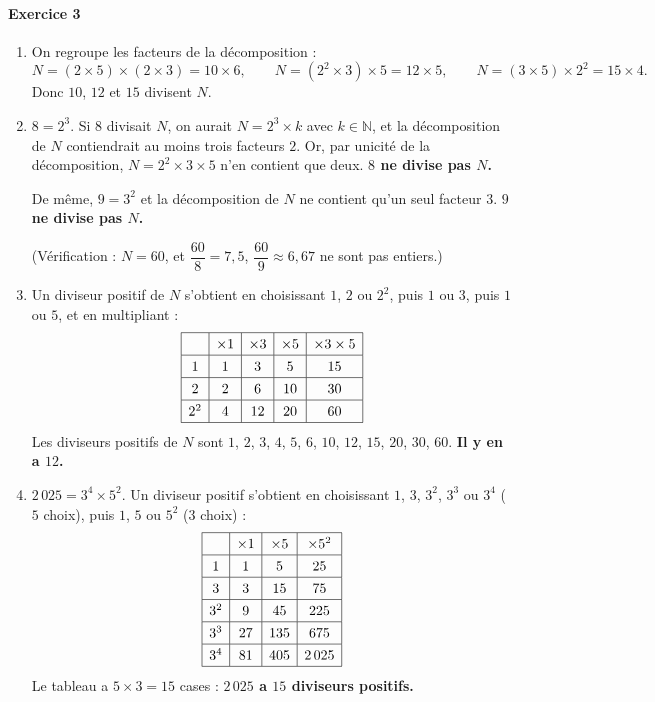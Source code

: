 \documentclass[11pt,a4paper]{article}
\newcommand{\N}{\mathbb{N}}
\newcommand{\exo}[1]{\paragraph{Exercice #1}}
\newcommand{\rep}[1]{\textbf{#1}}
\begin{document}
\exo{3}
\begin{enumerate}[label=\rep{\arabic*.}]
  \item On regroupe les facteurs de la décomposition :
  \[ N = (2 \times 5) \times (2 \times 3) = 10 \times 6, \qquad N = (2^2 \times 3) \times 5 = 12 \times 5, \qquad N = (3 \times 5) \times 2^2 = 15 \times 4. \]
  Donc $10$, $12$ et $15$ divisent $N$.

  \item $8 = 2^3$. Si $8$ divisait $N$, on aurait $N = 2^3 \times k$ avec $k \in \N$, et la décomposition de $N$ contiendrait au moins trois facteurs $2$. Or, par unicité de la décomposition, $N = 2^2 \times 3 \times 5$ n'en contient que deux. \rep{$8$ ne divise pas $N$.}

  De même, $9 = 3^2$ et la décomposition de $N$ ne contient qu'un seul facteur $3$. \rep{$9$ ne divise pas $N$.}

  (Vérification : $N = 60$, et $\dfrac{60}{8} = 7{,}5$, $\dfrac{60}{9} \approx 6{,}67$ ne sont pas entiers.)

  \item Un diviseur positif de $N$ s'obtient en choisissant $1$, $2$ ou $2^2$, puis $1$ ou $3$, puis $1$ ou $5$, et en multipliant :
  \[
  \renewcommand{\arraystretch}{1.3}
  \begin{array}{|c|c|c|c|c|}
  \hline
   & \times 1 & \times 3 & \times 5 & \times 3 \times 5 \\ \hline
  1   & 1 & 3  & 5  & 15 \\ \hline
  2   & 2 & 6  & 10 & 30 \\ \hline
  2^2 & 4 & 12 & 20 & 60 \\ \hline
  \end{array}
  \]
  Les diviseurs positifs de $N$ sont $1$, $2$, $3$, $4$, $5$, $6$, $10$, $12$, $15$, $20$, $30$, $60$. \rep{Il y en a $12$.}

  \item $2\,025 = 3^4 \times 5^2$. Un diviseur positif s'obtient en choisissant $1$, $3$, $3^2$, $3^3$ ou $3^4$ ($5$ choix), puis $1$, $5$ ou $5^2$ ($3$ choix) :
  \[
  \renewcommand{\arraystretch}{1.3}
  \begin{array}{|c|c|c|c|}
  \hline
   & \times 1 & \times 5 & \times 5^2 \\ \hline
  1   & 1  & 5   & 25 \\ \hline
  3   & 3  & 15  & 75 \\ \hline
  3^2 & 9  & 45  & 225 \\ \hline
  3^3 & 27 & 135 & 675 \\ \hline
  3^4 & 81 & 405 & 2\,025 \\ \hline
  \end{array}
  \]
  Le tableau a $5 \times 3 = 15$ cases : \rep{$2\,025$ a $15$ diviseurs positifs.}
\end{enumerate}
\end{document}
